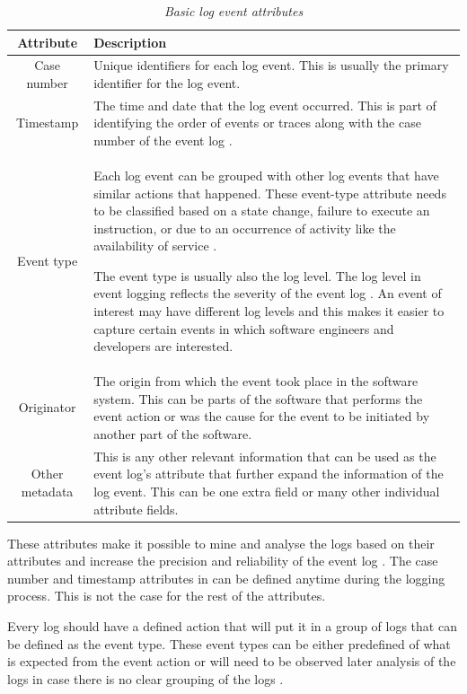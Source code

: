 \begin{table}[!htb]
	\centering
	\caption[Basic log event attributes]
	{\textit{Basic log event attributes \cite{Bekeneva2020}}}
	\label{tbl:ch1_logBasicAttributes}
	\begin{tabularx}{\textwidth}{|c|X|}
		\hline \textbf{Attribute} & \textbf{Description} \\
		\hline Case number & Unique identifiers for each log event. This is usually the primary identifier for the log event. \\
		\hline Timestamp & The time and date that the log event occurred. This is part of identifying the order of events or traces along with the case number of the event log \cite{Kherbouche2017}. \\
		\hline Event type & Each log event can be grouped with other log events that have similar actions that happened. These event-type attribute needs to be classified based on a state change, failure to execute an instruction, or due to an occurrence of activity like the availability of service \cite{Fedaghi2010}. \par The event type is usually also the log level. The log level in event logging reflects the severity of the event log \cite{Rong2020}. An event of interest may have different log levels and this makes it easier to capture certain events in which software engineers and developers are interested.\\
		\hline Originator & The origin from which the event took place in the software system. This can be parts of the software that performs the event action or was the cause for the event to be initiated by another part of the software. \\
		\hline Other metadata & This is any other relevant information that can be used as the event log's attribute that further expand the information of the log event. This can be one extra field or many other individual attribute fields.\\
		\hline
	\end{tabularx}
\end{table}

These attributes make it possible to mine and analyse the logs based on their attributes and increase the precision and reliability of the event log \cite{Kherbouche2017}. The case number and timestamp attributes in  can be defined anytime during the logging process. This is not the case for the rest of the attributes.\par Every log should have a defined action that will put it in a group of logs that can be defined as the event type. These event types can be either predefined of what is expected from the event action or will need to be observed later analysis of the logs in case there is no clear grouping of the logs \cite{Bekeneva2020, Fedaghi2010}.

